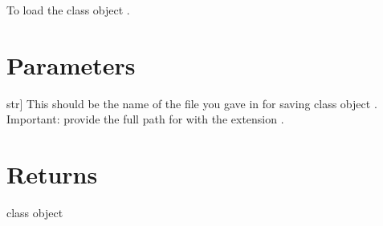 \documentclass[letterpaper,10pt,english]{sphinxmanual}
\begin{document}
\begin{fulllineitems}
\label{\detokenize{api:furs.load_furs}}
\pysigstartsignatures
{}
\pysigstopsignatures
\sphinxAtStartPar
To load the class object {\hyperref[\detokenize{api:module-furs}]{}}.


\section{Parameters}
\label{\detokenize{api:id1}}\begin{description}
\sphinxlineitem{filename}{[}str{]}
\sphinxAtStartPar
This should be the name of the file you gave in {\hyperref[\detokenize{api:furs.save_furs}]{}} for saving class object {\hyperref[\detokenize{api:module-furs}]{}}.
Important: provide the full path for  with the extension .

\end{description}


\section{Returns}
\label{\detokenize{api:returns}}
\sphinxAtStartPar
class object

\end{fulllineitems}

\end{document}

